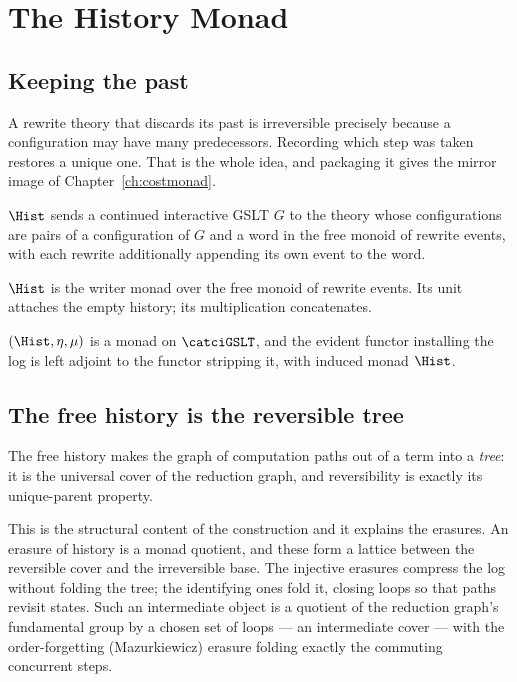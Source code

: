 \chapter{The History Monad}
\label{ch:histmonad}

\section{Keeping the past}

A rewrite theory that discards its past is irreversible precisely because a configuration
may have many predecessors. Recording which step was taken restores a unique one. That is
the whole idea, and packaging it gives the mirror image of Chapter~\ref{ch:costmonad}.

\begin{definition}
$\Hist$ sends a continued interactive GSLT $G$ to the theory whose configurations are
pairs of a configuration of $G$ and a word in the free monoid of rewrite events, with
each rewrite additionally appending its own event to the word.
\end{definition}

$\Hist$ is the writer monad over the free monoid of rewrite events. Its unit attaches
the empty history; its multiplication concatenates.

\begin{proposition}
$(\Hist, \eta, \mu)$ is a monad on $\catciGSLT$, and the evident functor installing the log
is left adjoint to the functor stripping it, with induced monad $\Hist$.
\end{proposition}

\section{The free history is the reversible tree}

\begin{proposition}
The free history makes the graph of computation paths out of a term into a \emph{tree}:
it is the universal cover of the reduction graph, and reversibility is exactly its
unique-parent property.
\end{proposition}

This is the structural content of the construction and it explains the erasures. An
erasure of history is a monad quotient, and these form a lattice between the reversible
cover and the irreversible base. The injective erasures compress the log without folding
the tree; the identifying ones fold it, closing loops so that paths revisit states. Such
an intermediate object is a quotient of the reduction graph's fundamental group by a
chosen set of loops --- an intermediate cover --- with the order-forgetting
(Mazurkiewicz) erasure folding exactly the commuting concurrent steps.

